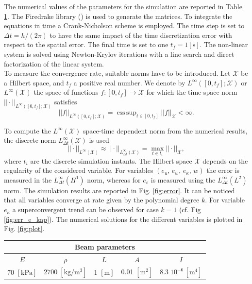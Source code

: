 \documentclass{ifacconf}
\DeclareMathOperator*{\esssup}{ess\,sup}
\begin{document}
The numerical values of the parameters for the simulation are reported in Table \ref{tab:par}. The Firedrake library (\cite{rathgeber2017firedrake}) is used to generate the matrices. To integrate the equations in time a Crank-Nicholson scheme is employed. The time step is set to $\Delta t = h/(2 \pi)$ to have the same impact of the time discretization error with respect to the spatial error. The final time is set to one $t_f = 1 [\textrm{s}]$. The non-linear system is solved using Newton-Krylov iterations with a line search and direct factorization of the linear system.  \\

To measure the convergence rate,  suitable norms have to be introduced. 
Let $\mathcal{X}$ be a Hilbert space, and $t_f$ a positive real number. We denote by $L^\infty([0, t_f]; \mathcal{X})$ or $L^\infty(\mathcal{X})$ the space of functions $f: [0, t_f] \rightarrow \mathcal{X}$ for which the time-space norm $||\cdot||_{L^\infty([0, t_f]; \mathcal{X})}$ satisfies
\[
||f||_{L^\infty([0, t_f]; \mathcal{X})} = \esssup_{t \in [0,t_f]} ||f||_{\mathcal{X}} < \infty.
\]

To compute the $L^\infty (\mathcal{X})$ space-time dependent norm from the numerical results, the discrete norm $L^\infty_{\Delta t} (\mathcal{X})$ is used
\[
||\cdot ||_{L^\infty (\mathcal{X})} \approx || \cdot ||_{L^\infty_{\Delta t} (\mathcal{X})} = \max_{t \in t_i} ||\cdot||_{\mathcal{X}},
\]
where $t_i$ are the discrete simulation instants. The Hilbert space $\mathcal{X}$ depends on the regularity of the considered variable. For variables $(e_u,\, e_w,\, e_\kappa,\, w)$ the error is measured in the $L^\infty_{\Delta t}(H^1)$ norm, whereas for $e_\varepsilon$ is measured using the $L^\infty_{\Delta t}(L^2)$ norm. The simulation results are reported in Fig. \ref{fig:error}. It can be noticed that all variables converge at rate given by the polynomial degree $k$. For variable $e_\kappa$ a superconvergent trend can be observed for case $k=1$ (cf. Fig \ref{fig:err_e_kap}). The numerical solutions for the different variables is plotted in Fig. \ref{fig:plot}.


\begin{table}[h]
	\centering
	\begin{tabular}{ccccc}
		\hline 
		\multicolumn{5}{c}{Beam parameters} \\ 
		\hline 
		$E$ & $\rho$ & $L$  & $A$ & $I$ \\
		70 $[\textrm{kPa}]$ & $2700\; [\textrm{kg}/\textrm{m}^3]$ & 1 $[\textrm{m}]$ &  0.01 $[\textrm{m}^2]$ & $8.3 \; 10^{-6} \, [\textrm{m}^4]$\\ 
		\hline 
	\end{tabular} 
	\captionsetup{width=0.95\linewidth}
	\vspace{1mm}
	\label{tab:par}
\end{table}
\end{document}
